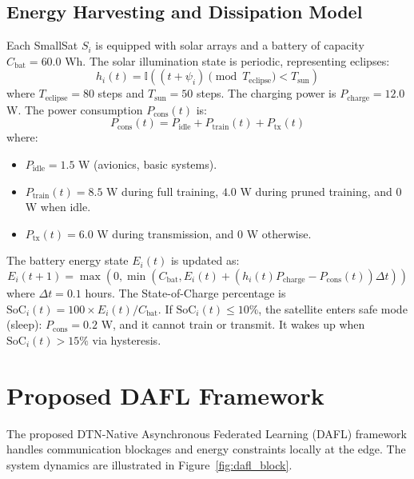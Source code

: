 \documentclass[journal,twocolumn]{IEEEtran}
\newcommand{\dafl}{\textsf{DAFL}}
\begin{document}
\subsection{Energy Harvesting and Dissipation Model}
Each SmallSat $S_i$ is equipped with solar arrays and a battery of capacity $C_{\text{bat}} = 60.0$ Wh. The solar illumination state is periodic, representing eclipses:
\begin{equation}
    h_i(t) = \mathbb{I}\left( (t + \psi_i) \pmod{T_{\text{eclipse}}} < T_{\text{sun}} \right)
\end{equation}
where $T_{\text{eclipse}} = 80$ steps and $T_{\text{sun}} = 50$ steps. The charging power is $P_{\text{charge}} = 12.0$ W.
The power consumption $P_{\text{cons}}(t)$ is:
\begin{equation}
    P_{\text{cons}}(t) = P_{\text{idle}} + P_{\text{train}}(t) + P_{\text{tx}}(t)
\end{equation}
where:
\begin{itemize}
    \item $P_{\text{idle}} = 1.5$ W (avionics, basic systems).
    \item $P_{\text{train}}(t) = 8.5$ W during full training, $4.0$ W during pruned training, and $0$ W when idle.
    \item $P_{\text{tx}}(t) = 6.0$ W during transmission, and $0$ W otherwise.
\end{itemize}
The battery energy state $E_i(t)$ is updated as:
\begin{equation}
    E_i(t+1) = \max\left(0, \min\left(C_{\text{bat}}, E_i(t) + \left( h_i(t)P_{\text{charge}} - P_{\text{cons}}(t) \right) \Delta t\right)\right)
\end{equation}
where $\Delta t = 0.1$ hours. The State-of-Charge percentage is $\text{SoC}_i(t) = 100 \times E_i(t) / C_{\text{bat}}$.
If $\text{SoC}_i(t) \le 10\%$, the satellite enters safe mode (sleep): $P_{\text{cons}} = 0.2$ W, and it cannot train or transmit. It wakes up when $\text{SoC}_i(t) > 15\%$ via hysteresis.

\section{Proposed DAFL Framework}
\label{sec:proposed}

The proposed DTN-Native Asynchronous Federated Learning (\dafl{}) framework handles communication blockages and energy constraints locally at the edge. The system dynamics are illustrated in Figure~\ref{fig:dafl_block}.
\end{document}
